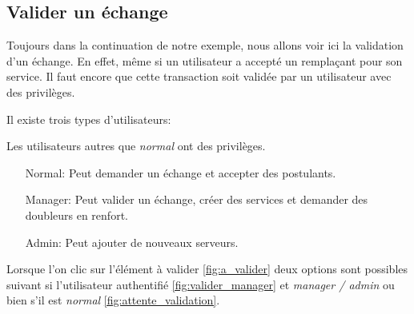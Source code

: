     \subsection*{Valider un échange}
    Toujours dans la continuation de notre exemple, nous allons voir ici 
    la validation d'un échange. En effet, même si un utilisateur
    a accepté un remplaçant pour son service. Il faut encore que cette
    transaction soit validée par un utilisateur avec des privilèges.

    Il existe trois types d'utilisateurs:
    \begin{center}
    \end{center}

    Les utilisateurs autres que \textit{normal} ont des privilèges.

    \begin{itemize}
        \item [Normal:] Peut demander un échange et accepter des postulants.
        \item [Manager:] Peut valider un échange, créer des services et demander des doubleurs en renfort.
        \item [Admin:] Peut ajouter de nouveaux serveurs. 
    \end{itemize}
    
    Lorsque l'on clic sur l'élément à valider \ref{fig:a_valider} deux options
    sont possibles suivant si l'utilisateur authentifié \ref{fig:valider_manager} et \textit{manager / admin} ou bien 
    s'il est \textit{normal} \ref{fig:attente_validation}.

